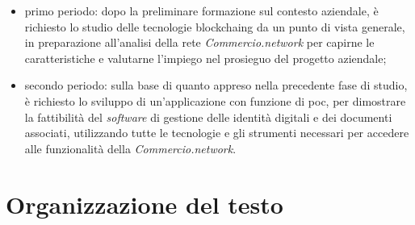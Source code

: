 \begin{itemize}
	\item primo periodo: dopo la preliminare formazione sul contesto aziendale, è richiesto lo studio delle tecnologie \gls{blockchaing} da un punto di vista generale, in preparazione all'analisi della rete \textit{Commercio.network} per capirne le caratteristiche e valutarne l'impiego nel prosieguo del progetto aziendale;
	\item secondo periodo: sulla base di quanto appreso nella precedente fase di studio, è richiesto lo sviluppo di un'applicazione con funzione di \gls{poc}\glsfirstoccur{}, per dimostrare la fattibilità del \textit{software} di gestione delle identità digitali e dei documenti associati, utilizzando tutte le tecnologie e gli strumenti necessari per accedere alle funzionalità della \textit{Commercio.network}. 
 \end{itemize}

\section{Organizzazione del testo}

